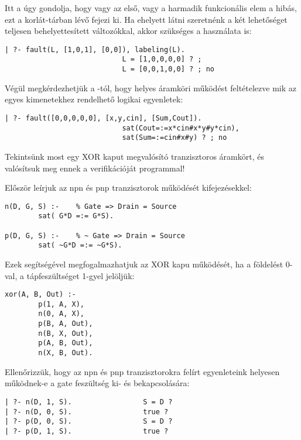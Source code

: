Itt a  úgy gondolja, hogy vagy az első, vagy a harmadik funkcionális
elem a hibás, ezt a korlát-tárban lévő  fejezi ki. Ha
ehelyett látni szeretnénk a két lehetőséget teljesen behelyettesített
változókkal, akkor szükséges a  használata is:

\begin{verbatim}
| ?- fault(L, [1,0,1], [0,0]), labeling(L).
                            L = [1,0,0,0,0] ? ;
                            L = [0,0,1,0,0] ? ; no
\end{verbatim}

Végül megkérdezhetjük a -tól, hogy helyes áramköri működést
feltételezve mik az egyes kimenetekhez rendelhető logikai egyenletek:

\begin{verbatim}
| ?- fault([0,0,0,0,0], [x,y,cin], [Sum,Cout]).
                            sat(Cout=:=x*cin#x*y#y*cin),
                            sat(Sum=:=cin#x#y) ? ; no
\end{verbatim}

Tekintsünk most egy XOR kaput megvalósító tranzisztoros áramkört, és
valósítsuk meg ennek a verifikációját \clpb programmal!

\begin{center}\end{center}

Először leírjuk az npn és pnp tranzisztorok működését \clpb kifejezésekkel:
\begin{verbatim}
n(D, G, S) :-    % Gate => Drain = Source
        sat( G*D =:= G*S).

p(D, G, S) :-    % ~ Gate => Drain = Source
        sat( ~G*D =:= ~G*S).
\end{verbatim}

Ezek segítségével megfogalmazhatjuk az XOR kapu működését, ha a földelést
0-val, a tápfeszültséget 1-gyel jelöljük:

\begin{verbatim}
xor(A, B, Out) :-
        p(1, A, X),
        n(0, A, X),
        p(B, A, Out),
        n(B, X, Out),
        p(A, B, Out),
        n(X, B, Out).
\end{verbatim}

Ellenőrizzük, hogy az npn és pnp tranzisztorokra felírt egyenleteink
helyesen működnek-e a gate feszültség ki- és bekapcsolására:

\begin{verbatim}
| ?- n(D, 1, S).                 S = D ?
| ?- n(D, 0, S).                 true ?
| ?- p(D, 0, S).                 S = D ?
| ?- p(D, 1, S).                 true ?
\end{verbatim}

